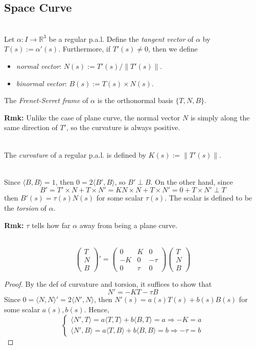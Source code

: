 \subsection{Space Curve}

\\
Let $\alpha: I\to\mathbb{R}^3$ be a regular p.a.l. Define the \textit{tangent vector} of $\alpha$ by $T(s) := \alpha'(s)$. Furthermore, if $T'(s)\neq 0$, then we define
\begin{itemize}
\item \textit{normal vector}: $N(s) := T'(s)\big/\|T'(s)\|$.
\item \textit{binormal vector}: $B(s) := T(s)\times N(s)$.
\end{itemize}
The \textit{Frenet-Serret frame} of $\alpha$ is the orthonormal basis $\{T, N, B\}$.

\noindent\textbf{Rmk:} Unlike the case of plane curve, the normal vector $N$ is simply along the same direction of $T'$, so the curvature is always positive.

\\
The \textit{curvature} of a regular p.a.l. is defined by $K(s) := \|T'(s)\|$.

\\
Since $\langle B, B\rangle = 1$, then $0 = 2\langle B', B\rangle$, so $B'\perp B$. On the other hand, since
\[
B' = T'\times N + T\times N' = KN\times N + T\times N' = 0 + T\times N'\perp T
\]
then $B'(s) = \tau(s)N(s)$ for some scalar $\tau(s)$. The scalar is defined to be the \textit{torsion} of $\alpha$.

\noindent\textbf{Rmk:} $\tau$ tells how far $\alpha$ away from being a plane curve.

\\
\[
\begin{pmatrix}T\\ N\\ B\end{pmatrix}' = \begin{pmatrix}0 & K & 0\\ -K & 0 & -\tau\\ 0 & \tau & 0\end{pmatrix}\begin{pmatrix}T\\ N\\ B\end{pmatrix}
\]

\begin{proof}
By the def of curvature and torsion, it suffices to show that
\[
N' = -KT - \tau B
\]
Since $0 = \langle N, N\rangle' = 2\langle N', N\rangle$, then $N'(s) = a(s)T(s) + b(s)B(s)$ for some scalar $a(s), b(s)$. Hence,
\[
\begin{cases}
\langle N', T\rangle = a\langle T, T\rangle + b\langle B, T\rangle = a \Rightarrow -K = a\\
\langle N', B\rangle = a\langle T, B\rangle + b\langle B, B\rangle = b \Rightarrow -\tau = b
\end{cases}
\]
\end{proof}

